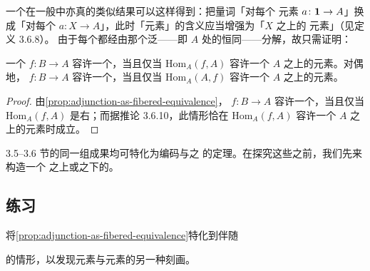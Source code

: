 一个在一般\trInfinityCosmos{}中亦真的类似结果可以这样得到：把量词「对每个%
元素 $a\colon\mathbf{1}\to A$」换成「对每个\trGeneralizedElement{}
$a\colon X\to A$」，此时「\trTerminal{}元素」的含义应当增强为「$X$ 之上的%
\trTerminal{}元素」（见定义 3.6.8）。
由于每个\trGeneralizedElement{}都经由那个泛\trGeneralizedElement{}——即 $A$
处的恒同\trFunctor{}——分解，故只需证明：

\begin{proposition}\label{prop:adjoint-criterion-terminal-element}
一个\trFunctor{} $f\colon B\to A$ 容许一个\trRightAdjoint，当且仅当
$\mathrm{Hom}_A(f,A)$ 容许一个 $A$ 之上的\trTerminal{}元素。对偶地，
$f\colon B\to A$ 容许一个\trLeftAdjoint，当且仅当 $\mathrm{Hom}_A(A,f)$
容许一个 $A$ 之上的\trInitial{}元素。
\end{proposition}

\begin{proof}
由\cref{prop:adjunction-as-fibered-equivalence}，\trFunctor{}
$f\colon B\to A$ 容许一个\trRightAdjoint，当且仅当\trCommaInfinityCategory{}
$\mathrm{Hom}_A(f,A)$ 是右\trRepresentable；而据推论 3.6.10，此情形恰在
$\mathrm{Hom}_A(f,A)$ 容许一个 $A$ 之上的\trTerminal{}元素时成立。
\end{proof}

3.5–3.6 节的同一组成果均可特化为编码\trLimit{}与\trColimit{}之%
\trUniversalProperty{}的定理。在探究这些之前，我们先来构造一个\trDiagram{}%
之上或之下的\trInfinityCategoryOfCones{}。

\subsection*{练习}

\begin{exercise}[4.3.13]\label{ex:specialize-point-adjunctions}
将\cref{prop:adjunction-as-fibered-equivalence}特化到伴随
\begin{center}
\end{center}
的情形，以发现\trInitial{}元素与\trTerminal{}元素的另一种刻画。
\end{exercise}

